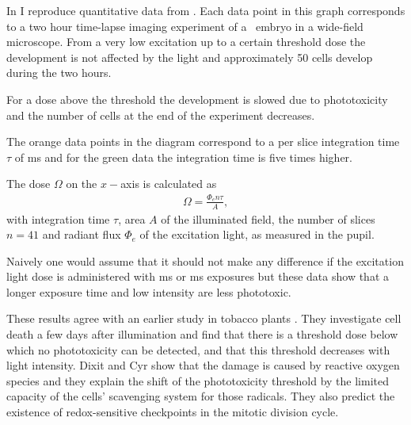 In  I reproduce quantitative data
from \cite{Tinevez2012}. Each data point in this graph corresponds to
a two hour time-lapse imaging experiment of a \celegans\ embryo in a
wide-field microscope. From a very low excitation up to a certain
threshold dose the development is not affected by the light and
approximately 50 cells develop during the two hours.

For a dose above the threshold the development is slowed due to
phototoxicity and the number of cells at the end of the experiment
decreases.


The orange data points in the diagram correspond to a per slice
integration time $\tau$ of \unit[100]{ms} and for the green data
the integration time is five times higher.

The dose $\Omega$ on the $x-$axis is calculated as
\begin{align}
\Omega = \frac{\Phi_e n \tau}{A},
\end{align}
with integration time $\tau$, area $A$ of the illuminated field, the
number of slices $n=41$ and radiant flux $\Phi_e$ of the excitation
light, as measured in the pupil.

Naively one would assume that it should not make any difference if the
excitation light dose is administered with \unit[100]{ms} or
\unit[500]{ms} exposures but these data show that a longer exposure
time and low intensity are less phototoxic.

These results agree with an earlier study in tobacco plants
\citep{Dixit2003}. They investigate cell death a few days after
illumination and find that there is a threshold dose below which no
phototoxicity can be detected, and that this threshold decreases with
light intensity. Dixit and Cyr show that the damage is caused by
reactive oxygen species and they explain the shift of the
phototoxicity threshold by the limited capacity of the cells'
scavenging system for those radicals. They also predict the existence
of redox-sensitive checkpoints in the mitotic division cycle.

